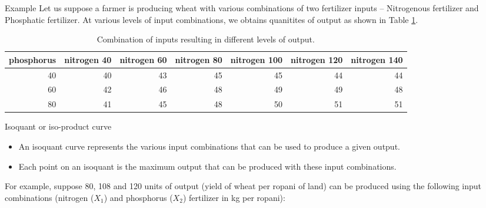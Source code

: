 \documentclass[12pt,ignorenonframetext,aspectratio=169]{beamer}
\providecommand{\tightlist}{%
  \setlength{\itemsep}{0pt}\setlength{\parskip}{0pt}}
\begin{document}
\begin{frame}{Example}
\protect\hypertarget{example}{}
Let us suppose a farmer is producing wheat with various combinations of
two fertilizer inputs -- Nitrogenous fertilizer and Phosphatic
fertilizer. At various levels of input combinations, we obtains
quanitites of output as shown in Table \ref{tab:np-factor-factor}.

\begin{table}

\caption{\label{tab:np-factor-factor}Combination of inputs resulting in different levels of output.}
\centering
\fontsize{6}{8}\selectfont
\begin{tabular}[t]{rrrrrrr}
\toprule
phosphorus & nitrogen 40 & nitrogen 60 & nitrogen 80 & nitrogen 100 & nitrogen 120 & nitrogen 140\\
\midrule
\rowcolor{gray!6}  40 & 40 & 43 & 45 & 45 & 44 & 44\\
60 & 42 & 46 & 48 & 49 & 49 & 48\\
\rowcolor{gray!6}  80 & 41 & 45 & 48 & 50 & 51 & 51\\
\bottomrule
\end{tabular}
\end{table}
\end{frame}

\begin{frame}{Isoquant or iso-product curve}
\protect\hypertarget{isoquant-or-iso-product-curve}{}
\begin{itemize}
\tightlist
\item
  An isoquant curve represents the various input combinations that can
  be used to produce a given output.
\item
  Each point on an isoquant is the maximum output that can be produced
  with these input combinations.
\end{itemize}

For example, suppose 80, 108 and 120 units of output (yield of wheat per
ropani of land) can be produced using the following input combinations
(nitrogen (\(X_1\)) and phosphorus (\(X_2\)) fertilizer in kg per
ropani):
\end{frame}
\end{document}
